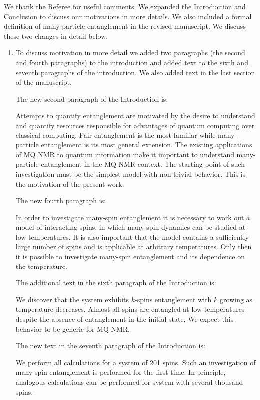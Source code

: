 We thank the Referee for useful comments. We expanded the Introduction and Conclusion to discuss our motivations in more details. We also included a formal definition of many-particle entanglement in the revised manuscript. We discuss these two changes in detail below. 
\begin{enumerate}
\item To discuss motivation in more detail we added two paragraphs (the second and fourth paragraphs) to the introduction and added text to the sixth and seventh paragraphs of the introduction. We also added text in the last section of the manuscript.

The new second paragraph of the Introduction is:

Attempts to quantify entanglement are motivated by the
desire to understand and quantify resources responsible for
advantages  of quantum computing over classical computing. Pair entanglement is the most familiar while many-particle entanglement is its most general extension.
The existing applications of  MQ NMR to quantum information make it important to understand many-particle entanglement in the MQ NMR context. The starting point of such investigation must be the simplest model with non-trivial behavior. This is the motivation of the present work.

The new fourth paragraph  is:

In order to investigate many-spin entanglement it is necessary to work out a model of interacting spins, in which many-spin dynamics can be studied at low temperatures. 
It is also important that the model contains a sufficiently large number of spins and is applicable at arbitrary temperatures.
Only then it is possible to investigate many-spin entanglement and its dependence on the temperature.

The additional  text in the sixth paragraph of the Introduction is:

We discover that the system exhibits $k$-spins entanglement with $k$ growing as temperature decreases. 
Almost all spins are entangled at low temperatures despite the absence of  entanglement in the initial state. We expect this behavior to be generic for MQ NMR. 

The new text in the seventh paragraph of the Introduction is:

We perform all calculations for a system of 201 spins. 
Such an investigation of many-spin entanglement is performed for the first time.
In principle, analogous calculations can be performed for  system with several thousand  spins. 


\end{enumerate}
